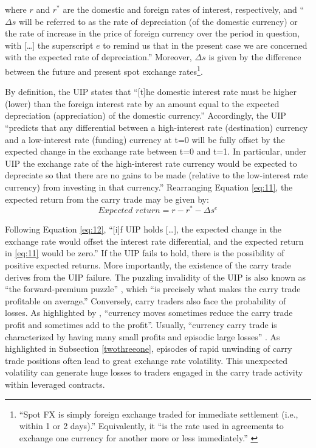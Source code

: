 \documentclass[a4paper, twoside]{templates/ociamthesis}
\begin{document}
\noindent where \(r\) and \(r^*\) are the domestic and foreign rates of interest, respectively, and ``\(\Delta{s}\) will be referred to as the rate of depreciation (of the domestic currency) or the rate of increase in the price of foreign currency over the period in question, with {[}\ldots{]} the superscript \(e\) to remind us that in the present case we are concerned with the expected rate of depreciation.'' \autocite[ 90]{copeland2014} Moreover, \(\Delta{s}\) is given by the difference between the future and present spot exchange rates\footnote{``Spot FX is simply foreign exchange traded for immediate settlement (i.e., within 1 or 2 days).'' \autocite[ 17]{donnelly2019} Equivalently, it ``is the rate used in agreements to exchange one currency for another more or less immediately.'' \autocite[ 92]{copeland2014}}.

By definition, the UIP states that ``{[}t{]}he domestic interest rate must be higher (lower) than the foreign interest rate by an amount equal to the expected depreciation (appreciation) of the domestic currency.'' \autocite[ 91]{copeland2014} Accordingly, the UIP ``predicts that any differential between a high-interest rate (destination) currency and a low-interest rate (funding) currency at t=0 will be fully offset by the expected change in the exchange rate between t=0 and t=1. In particular, under UIP the exchange rate of the high-interest rate currency would be expected to depreciate so that there are no gains to be made (relative to the low-interest rate currency) from investing in that currency.'' \autocite[ 5]{bankforinternationalsettlements2015} Rearranging Equation \eqref{eq:11}, the expected return from the carry trade may be given by:
\begin{equation}
\textit{Expected return} = r - r^* - \Delta{s}^e
\label{eq:12}
\end{equation}

Following Equation \eqref{eq:12}, ``{[}i{]}f UIP holds {[}\ldots{]}, the expected change in the exchange rate would offset the interest rate differential, and the expected return in \eqref{eq:11} would be zero.'' \autocite[ 5]{bankforinternationalsettlements2015} If the UIP fails to hold, there is the possibility of positive expected returns. More importantly, the existence of the carry trade derives from the UIP failure. The puzzling invalidity of the UIP is also known as ``the forward-premium puzzle'' \autocites[ 448]{lothian2011}[ 404]{cieplinski2017}, which ``is precisely what makes the carry trade profitable on average.'' \autocite[ 313]{brunnermeier2008} Conversely, carry traders also face the probability of losses. As highlighted by \textcite[ 185]{pedersen2015}, ``currency moves sometimes reduce the carry trade profit and sometimes add to the profit''. Usually, ``currency carry trade is characterized by having many small profits and episodic large losses'' \autocite[ 185]{pedersen2015}. As highlighted in Subsection \ref{twothreeone}, episodes of rapid unwinding of carry trade positions often lead to great exchange rate volatility. This unexpected volatility can generate huge losses to traders engaged in the carry trade activity within leveraged contracts.
\end{document}
